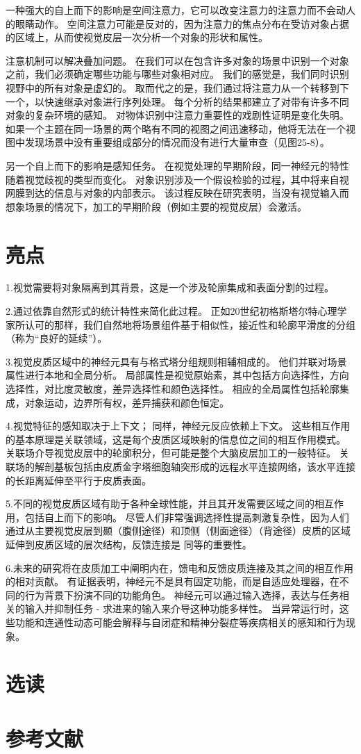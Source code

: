一种强大的自上而下的影响是空间注意力，它可以改变注意力的注意力而不会动人的眼睛动作。
空间注意力可能是反对的，因为注意力的焦点分布在受访对象占据的区域上，从而使视觉皮层一次分析一个对象的形状和属性。


注意机制可以解决叠加问题。
在我们可以在包含许多对象的场景中识别一个对象之前，我们必须确定哪些功能与哪些对象相对应。
我们的感觉是，我们同时识别视野中的所有对象是虚幻的。
取而代之的是，我们通过将注意力从一个转移到下一个，以快速继承对象进行序列处理。
每个分析的结果都建立了对带有许多不同对象的复杂环境的感知。
对物体识别中注意力重要性的戏剧性证明是变化失明。 
如果一个主题在同一场景的两个略有不同的视图之间迅速移动，他将无法在一个视图中发现场景中没有重要组成部分的情况而没有进行大量审查（见图25-8）。


另一个自上而下的影响是感知任务。
在视觉处理的早期阶段，同一神经元的特性随着视觉歧视的类型而变化。
对象识别涉及一个假设检验的过程，其中将来自视网膜到达的信息与对象的内部表示。
该过程反映在研究表明，当没有视觉输入而想象场景的情况下，加工的早期阶段（例如主要的视觉皮层）会激活。



\section{亮点}
1.视觉需要将对象隔离到其背景，这是一个涉及轮廓集成和表面分割的过程。 


2.通过依靠自然形式的统计特性来简化此过程。
正如20世纪初格斯塔尔特心理学家所认可的那样，我们自然地将场景组件基于相似性，接近性和轮廓平滑度的分组（称为“良好的延续”）。 


3.视觉皮质区域中的神经元具有与格式塔分组规则相辅相成的。
他们并联对场景属性进行本地和全局分析。
局部属性是视觉原始素，其中包括方向选择性，方向选择性，对比度灵敏度，差异选择性和颜色选择性。
相应的全局属性包括轮廓集成，对象运动，边界所有权，差异捕获和颜色恒定。 


4.视觉特征的感知取决于上下文； 
同样，神经元反应依赖上下文。 
这些相互作用的基本原理是关联领域，这是每个皮质区域映射的信息位之间的相互作用模式。
关联场介导视觉皮层中的轮廓积分，但可能是整个大脑皮层加工的一般特征。
关联场的解剖基板包括由皮质金字塔细胞轴突形成的远程水平连接网络，该水平连接的长距离延伸至平行于皮质表面。 


5.不同的视觉皮质区域有助于各种全球性能，并且其开发需要区域之间的相互作用，包括自上而下的影响。
尽管人们非常强调选择性提高刺激复杂性，因为人们通过从主要视觉皮层到颞（腹侧途径）和顶侧（侧面途径）（背途径）皮质的区域延伸到皮质区域的层次结构，反馈连接是 同等的重要性。 


6.未来的研究将在皮质加工中阐明内在，馈电和反馈皮质连接及其之间的相互作用的相对贡献。 
有证据表明，神经元不是具有固定功能，而是自适应处理器，在不同的行为背景下扮演不同的功能角色。
神经元可以通过输入选择，表达与任务相关的输入并抑制任务 - 求进来的输入来介导这种功能多样性。
当异常运行时，这些功能和连通性动态可能会解释与自闭症和精神分裂症等疾病相关的感知和行为现象。


\section{选读}
\section{参考文献}